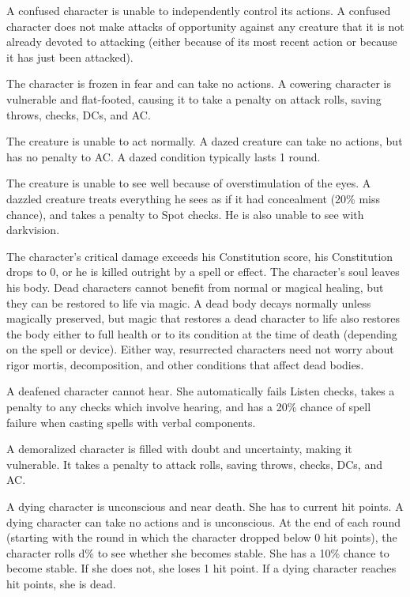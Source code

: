  A confused character is unable to independently control its actions. \confusionexplanation A confused character does not make attacks of opportunity against any creature that it is not already devoted to attacking (either because of its most recent action or because it has just been attacked).

 The character is frozen in fear and can take no actions. A cowering character is vulnerable and flat-footed, causing it to take a  penalty on attack rolls, saving throws, checks, DCs, and AC.

 The creature is unable to act normally. A dazed creature can take no actions, but has no penalty to AC. A dazed condition typically lasts 1 round.

 The creature is unable to see well because of overstimulation of the eyes. A dazzled creature treats everything he sees as if it had concealment (20\% miss chance), and takes a  penalty to Spot checks. He is also unable to see with darkvision.

 The character's critical damage exceeds his Constitution score, his Constitution drops to 0, or he is killed outright by a spell or effect. The character's soul leaves his body. Dead characters cannot benefit from normal or magical healing, but they can be restored to life via magic. A dead body decays normally unless magically preserved, but magic that restores a dead character to life also restores the body either to full health or to its condition at the time of death (depending on the spell or device). Either way, resurrected characters need not worry about rigor mortis, decomposition, and other conditions that affect dead bodies.

 A deafened character cannot hear. She automatically fails Listen checks, takes a  penalty to any checks which involve hearing, and has a 20\% chance of spell failure when casting spells with verbal components.

 A demoralized character is filled with doubt and uncertainty, making it vulnerable. It takes a  penalty to attack rolls, saving throws, checks, DCs, and AC.

 A dying character is unconscious and near death. She has  to  current hit points. A dying character can take no actions and is unconscious. At the end of each round (starting with the round in which the character dropped below 0 hit points), the character rolls d\% to see whether she becomes stable. She has a 10\% chance to become stable. If she does not, she loses 1 hit point. If a dying character reaches  hit points, she is dead.

